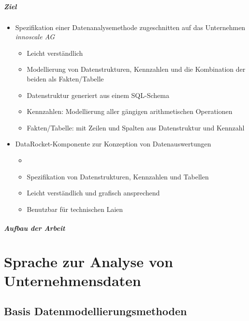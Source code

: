 \documentclass[
  language=german, %
  type=bachelor%
]{isthesis}
\begin{document}
\begin{content}
  \paragraph{Ziel}
  \begin{itemize}
    \item Spezifikation einer Datenanalysemethode zugeschnitten auf das
      Unternehmen \textit{innoscale AG}
      \begin{itemize}
        \item Leicht verständlich
        \item Modellierung von Datenstrukturen, Kennzahlen und die Kombination der
          beiden als Fakten/Tabelle
        \item Datenstruktur generiert aus einem SQL-Schema
        \item Kennzahlen: Modellierung aller gängigen arithmetischen Operationen
        \item Fakten/Tabelle: mit Zeilen und Spalten aus Datenstruktur und Kennzahl 
      \end{itemize}
    \item DataRocket-Komponente zur Konzeption von Datenauswertungen
      \begin{itemize}
        \item {}
        \item Spezifikation von Datenstrukturen, Kennzahlen und Tabellen
        \item Leicht verständlich und grafisch ansprechend
        \item Benutzbar für technischen Laien
      \end{itemize}
  \end{itemize}

  \paragraph{Aufbau der Arbeit}




  \chapter{Sprache zur Analyse von Unternehmensdaten}

  \section{Basis Datenmodellierungsmethoden}


\end{content}
\end{document}
